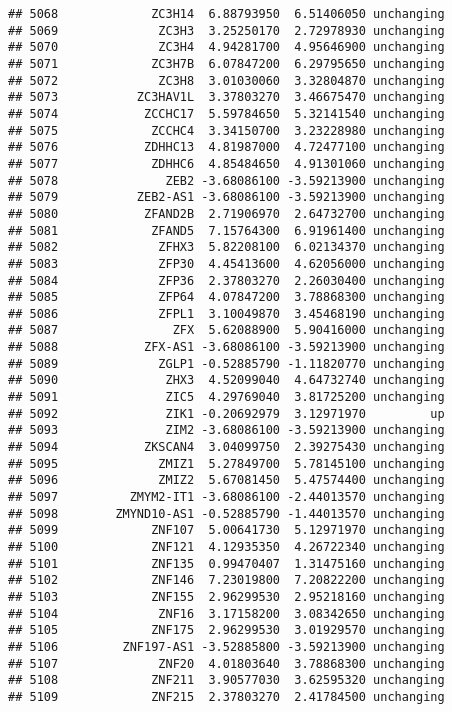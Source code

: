 \documentclass[]{article}
\begin{document}
\begin{verbatim}
## 5068             ZC3H14  6.88793950  6.51406050 unchanging
## 5069              ZC3H3  3.25250170  2.72978930 unchanging
## 5070              ZC3H4  4.94281700  4.95646900 unchanging
## 5071             ZC3H7B  6.07847200  6.29795650 unchanging
## 5072              ZC3H8  3.01030060  3.32804870 unchanging
## 5073           ZC3HAV1L  3.37803270  3.46675470 unchanging
## 5074            ZCCHC17  5.59784650  5.32141540 unchanging
## 5075             ZCCHC4  3.34150700  3.23228980 unchanging
## 5076            ZDHHC13  4.81987000  4.72477100 unchanging
## 5077             ZDHHC6  4.85484650  4.91301060 unchanging
## 5078               ZEB2 -3.68086100 -3.59213900 unchanging
## 5079           ZEB2-AS1 -3.68086100 -3.59213900 unchanging
## 5080            ZFAND2B  2.71906970  2.64732700 unchanging
## 5081             ZFAND5  7.15764300  6.91961400 unchanging
## 5082              ZFHX3  5.82208100  6.02134370 unchanging
## 5083              ZFP30  4.45413600  4.62056000 unchanging
## 5084              ZFP36  2.37803270  2.26030400 unchanging
## 5085              ZFP64  4.07847200  3.78868300 unchanging
## 5086              ZFPL1  3.10049870  3.45468190 unchanging
## 5087                ZFX  5.62088900  5.90416000 unchanging
## 5088            ZFX-AS1 -3.68086100 -3.59213900 unchanging
## 5089              ZGLP1 -0.52885790 -1.11820770 unchanging
## 5090               ZHX3  4.52099040  4.64732740 unchanging
## 5091               ZIC5  4.29769040  3.81725200 unchanging
## 5092               ZIK1 -0.20692979  3.12971970         up
## 5093               ZIM2 -3.68086100 -3.59213900 unchanging
## 5094            ZKSCAN4  3.04099750  2.39275430 unchanging
## 5095              ZMIZ1  5.27849700  5.78145100 unchanging
## 5096              ZMIZ2  5.67081450  5.47574400 unchanging
## 5097          ZMYM2-IT1 -3.68086100 -2.44013570 unchanging
## 5098        ZMYND10-AS1 -0.52885790 -1.44013570 unchanging
## 5099             ZNF107  5.00641730  5.12971970 unchanging
## 5100             ZNF121  4.12935350  4.26722340 unchanging
## 5101             ZNF135  0.99470407  1.31475160 unchanging
## 5102             ZNF146  7.23019800  7.20822200 unchanging
## 5103             ZNF155  2.96299530  2.95218160 unchanging
## 5104              ZNF16  3.17158200  3.08342650 unchanging
## 5105             ZNF175  2.96299530  3.01929570 unchanging
## 5106         ZNF197-AS1 -3.52885800 -3.59213900 unchanging
## 5107              ZNF20  4.01803640  3.78868300 unchanging
## 5108             ZNF211  3.90577030  3.62595320 unchanging
## 5109             ZNF215  2.37803270  2.41784500 unchanging

\end{verbatim}
\end{document}
